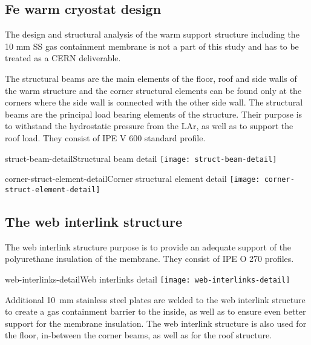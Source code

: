 \subsection{Fe warm cryostat design}

The design and structural analysis of the warm support structure including the 10 mm SS gas containment membrane is not a part of this study and has to be treated as a CERN deliverable. 

The structural beams are the main elements of the floor, roof and side walls of the warm structure and the corner structural elements can be found only at the corners where the side wall is connected with the other side wall. The structural beams are the principal load bearing elements of the structure. Their purpose is to withstand the hydrostatic pressure from the LAr, as well as to support the roof load. They consist of IPE V 600 standard profile. 

\begin{cdrfigure}{struct-beam-detail}{Structural beam detail}
  \texttt{[image: struct-beam-detail]}
\end{cdrfigure}

\begin{cdrfigure}{corner-struct-element-detail}{Corner structural element detail}
  \texttt{[image: corner-struct-element-detail]}
\end{cdrfigure}


\subsection{The web interlink structure}

The web interlink structure purpose is to provide an adequate support of the polyurethane insulation of the membrane. They consist of IPE O 270 profiles. 

\begin{cdrfigure}{web-interlinks-detail}{Web interlinks detail}
  \texttt{[image: web-interlinks-detail]}
\end{cdrfigure}


Additional \SI{10}{mm} stainless steel plates are welded to the web interlink structure to create a gas containment barrier to the inside, as well as to ensure even better support for the membrane insulation. 
The web interlink structure is also used for the floor, in-between the corner beams, as well as for the roof structure.

